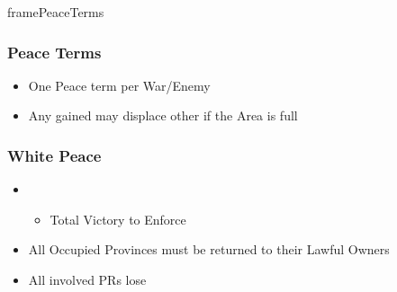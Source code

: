 \documentclass[10pt]{article}
\begin{document}
\begin{dynamiccontents*}{framePeaceTerms}
	\begin{multicols}{3}
		\subsubsection*{Peace Terms }
		\begin{itemize}
			\item One Peace term per War/Enemy
			\item Any gained \influence may displace other \influence if the Area is full
		\end{itemize}

		\subsubsection*{White Peace}
		\begin{itemize}
			\item {}
			\begin{itemize}
				\item Total Victory to Enforce
			\end{itemize}
			\item All Occupied Provinces must be returned to their Lawful Owners
			\item All involved PRs lose 
		\end{itemize}


\end{multicols}
\end{dynamiccontents*}
\end{document}
